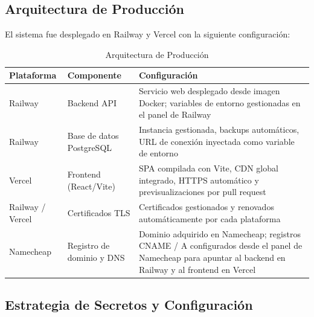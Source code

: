 \subsection{Arquitectura de Producción}\label{arquitectura-de-producciuxf3n}

El sistema fue desplegado en Railway y Vercel con la siguiente configuración:

\begin{longtable}[]{@{}
  >{\raggedright\arraybackslash}p{}
  >{\raggedright\arraybackslash}p{}
  >{\raggedright\arraybackslash}p{}@{}}
\caption[Arquitectura de Producción]{Arquitectura de Producción}\tabularnewline
\toprule\noalign{}
\begin{minipage}[b]{\linewidth}\raggedright
Plataforma
\end{minipage} & \begin{minipage}[b]{\linewidth}\raggedright
Componente
\end{minipage} & \begin{minipage}[b]{\linewidth}\raggedright
Configuración
\end{minipage} \\
\midrule\noalign{}
\endhead
\bottomrule\noalign{}
\endlastfoot
Railway & Backend API & Servicio web desplegado desde imagen Docker; variables de entorno gestionadas en el panel de Railway \\
Railway & Base de datos PostgreSQL & Instancia gestionada, backups automáticos, URL de conexión inyectada como variable de entorno \\
Vercel & Frontend (React/Vite) & SPA compilada con Vite, CDN global integrado, HTTPS automático y previsualizaciones por pull request \\
Railway / Vercel & Certificados TLS & Certificados gestionados y renovados automáticamente por cada plataforma \\
Namecheap & Registro de dominio y DNS & Dominio adquirido en Namecheap; registros CNAME / A configurados desde el panel de Namecheap para apuntar al backend en Railway y al frontend en Vercel \\
\end{longtable}

\subsection{Estrategia de Secretos y Configuración}\label{estrategia-de-secretos-y-configuraciuxf3n}

